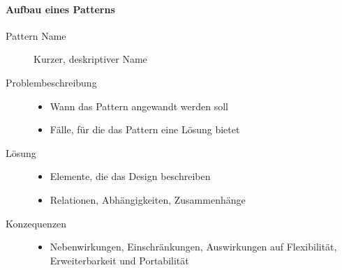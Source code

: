 \documentclass[
    ngerman,
    color=3b,
    summary,
    boxarc,
    main,
]{rubos-tuda-template}
\begin{document}
\paragraph{Aufbau eines Patterns}\begin{description}
    \item[Pattern Name] Kurzer, deskriptiver Name
    \item[Problembeschreibung] \begin{itemize}
              \item Wann das Pattern angewandt werden soll
              \item Fälle, für die das Pattern eine Lösung bietet
          \end{itemize}
    \item[Lösung] \begin{itemize}
              \item Elemente, die das Design beschreiben
              \item Relationen, Abhängigkeiten, Zusammenhänge
          \end{itemize}
    \item[Konzequenzen] \begin{itemize}
              \item Nebenwirkungen, Einschränkungen, Auswirkungen auf Flexibilität, Erweiterbarkeit und Portabilität
          \end{itemize}
\end{description}
\end{document}
